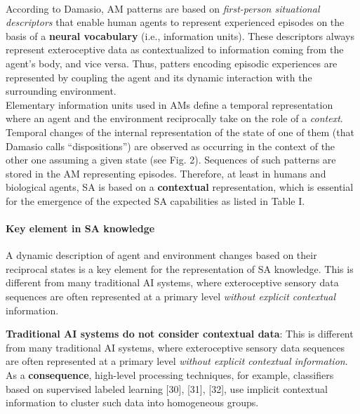 \documentclass{article}
\begin{document}
			\paragraph{} According to Damasio, AM patterns are based on \emph{first-person situational descriptors} that enable human agents to represent experienced episodes on the basis of a \textbf{neural vocabulary} (i.e., information units). These descriptors always represent exteroceptive data as contextualized to information coming from the agent's body, and vice versa. Thus, patters encoding episodic experiences are represented by coupling the agent and its dynamic interaction with the surrounding environment.
			\\
			Elementary information units used in AMs define a temporal representation where an agent and the environment reciprocally take on the role of a \emph{context}. Temporal changes of the internal representation of the state of one of them (that Damasio calls “dispositions”) are observed as occurring in the context of the other one assuming a given state (see Fig. 2). Sequences of such patterns are stored in the AM representing
			episodes. Therefore, at least in humans and biological agents, SA is based on a \textbf{contextual} representation, which is essential
			for the emergence of the expected SA capabilities as listed in
			\citet{regazzoni-2020-multi-sensorial-generative-and-descriptive-self-awareness-models-for-autonomous-systems} Table I.
			
			\paragraph{Key element in SA knowledge}A dynamic description of agent and environment changes based on their reciprocal states is a key element for the representation of SA knowledge. This is different from many traditional AI systems, where exteroceptive sensory data sequences are often represented at a primary level \emph{without explicit contextual} information. 
		
			\textbf{Traditional AI systems do not consider contextual data}: This is different from many
			traditional AI systems, where exteroceptive sensory data sequences are often represented at a primary level \emph{without explicit contextual information}. As a \textbf{consequence}, high-level
			processing techniques, for example, classifiers based on supervised labeled learning [30], [31], [32], use implicit contextual information to cluster such data into homogeneous groups.
			
\end{document}
